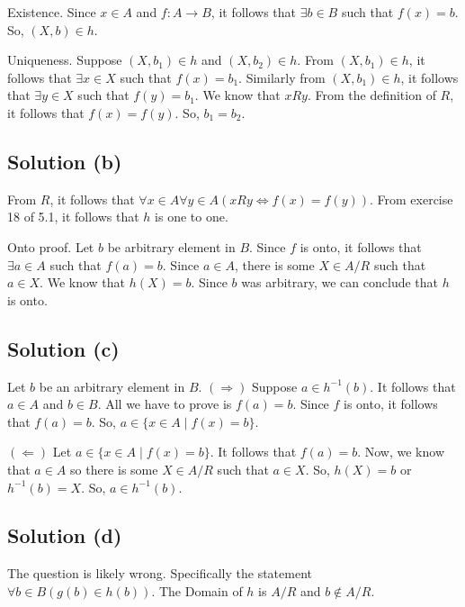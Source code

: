 \documentclass{article}
\begin{document}
Existence. Since $x \in A$ and $f: A \to B$, it follows that $\exists
b \in B$ such that $f(x) = b$. So, $(X,b) \in h$.

Uniqueness. Suppose $(X,b_1) \in h$ and $(X, b_2) \in h$. From $(X,
b_1) \in h$, it follows that $\exists x \in X$ such that $f(x)=b_1$.
Similarly from $(X,b_1) \in h$, it follows that $\exists y \in X$ such
that $f(y)=b_1$. We know that $xRy$. From the definition of $R$, it
follows that $f(x) = f(y)$. So, $b_1 = b_2$.

\subsection{Solution (b)}
From $R$, it follows that $\forall x \in A \forall y \in A(xRy \iff
f(x) = f(y))$. From exercise 18 of 5.1, it follows that $h$ is one to
one.

Onto proof. Let $b$ be arbitrary element in $B$. Since $f$ is onto, it
follows that $\exists a \in A$ such that $f(a)=b$. Since $a \in A$,
there is some $X \in A/R$ such that $a \in X$. We know that $h(X)=b$.
Since $b$ was arbitrary, we can conclude that $h$ is onto.

\subsection{Solution (c)}
Let $b$ be an arbitrary element in $B$.
$(\Rightarrow)$ Suppose $a \in h^{-1}(b)$. It follows that $a \in A$
and $b \in B$. All we have to prove is $f(a) = b$. Since $f$ is onto,
it follows that $f(a) =b$. So, $a \in \{x \in A \mid f(x) = b\}$.

$(\Leftarrow)$ Let $a \in \{x \in A \mid f(x) = b\}$. It follows that
$f(a)=b$. Now, we know that $a \in A$ so there is some $X \in A/R$
such that $a \in X$. So, $h(X) = b$ or $h^{-1}(b) = X$. So, $a \in h^{-1}(b)$.

\subsection{Solution (d)}
The question is likely wrong. Specifically the statement $\forall b
\in B(g(b) \in h(b))$. The Domain of $h$ is $A/R$ and $b \notin A/R$.
\end{document}

